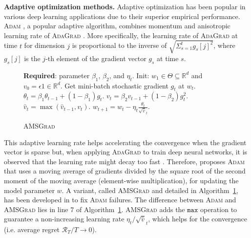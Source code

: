\documentclass[11pt]{article}
\theoremstyle{k}
\begin{document}
\textbf{Adaptive optimization methods.}\hspace{0.1cm}
Adaptive optimization has been popular in various deep learning applications due to their superior empirical performance.
\textsc{Adam} \citep{KB15}, a popular adaptive algorithm, combines momentum \citep{P64} and anisotropic learning rate of \textsc{AdaGrad} \citep{DHS11}.
More specifically, the learning rate of \textsc{AdaGrad} at time $t$ for dimension $j$ is proportional to the inverse of $\sqrt{ \Sigma_{s=1}^t g_s[j]^2 }$, where $g_s[j]$ is the $j$-th element of the gradient vector $g_s$ at time $s$.
\begin{figure}\vspace{-0.8cm}
\begin{minipage}{\linewidth}
\begin{algorithm}[H]
\caption{\textsc{AMSGrad} \citep{RKK18}} \label{alg:amsgrad}
\begin{algorithmic}[1]
\small
\STATE \textbf{Required}: parameter $\beta_1$, $\beta_2$, and $\eta_t$. 
\STATE Init: $w_{1} \in \Theta \subseteq \mathbb R^d $ and $v_{0} = \epsilon 1 \in \mathbb R^{d}$.
\STATE Get mini-batch stochastic gradient $g_t$ at $w_t$.
\STATE $\theta_t = \beta_1 \theta_{t-1} + (1 - \beta_1) g_t$.
\STATE $v_t = \beta_2 v_{t-1} + (1 - \beta_2) g_t^2$. 
\STATE $\hat{v}_t = \max( \hat{v}_{t-1} , v_t )$. 
\STATE $w_{t+1} = w_t - \eta_t \frac{\theta_t}{ \sqrt{\hat{v}}_t }$.
\ENDFOR
\end{algorithmic}
\end{algorithm}\vspace{.1cm}
\end{minipage}\end{figure}
This adaptive learning rate helps accelerating the convergence when the gradient vector is sparse \citep{DHS11} but, when applying \textsc{AdaGrad} to train deep neural networks, it is observed that the learning rate might decay too fast \citep{KB15}.
Therefore, \citep{KB15} proposes \textsc{Adam} that uses a moving average of gradients divided by the square root of the second moment of the moving average (element-wise multiplication), for updating the model parameter $w$.
A variant, called \textsc{AMSGrad} and detailed in Algorithm~\ref{alg:amsgrad}, has been developed in \citep{RKK18} to fix \textsc{Adam} failures.
The difference between \textsc{Adam} and \textsc{AMSGrad} lies in line 7 of Algorithm~\ref{alg:amsgrad}.
\textsc{AMSGrad} \citep{RKK18} adds the $\texttt{max}$ operation to guarantee a non-increasing learning rate $\eta_t / \sqrt{\hat{v}}_t $, which helps for the convergence (i.e. average regret $\mathcal{R}_T/T \rightarrow 0$).
\vspace{-0.1in}
\end{document}
